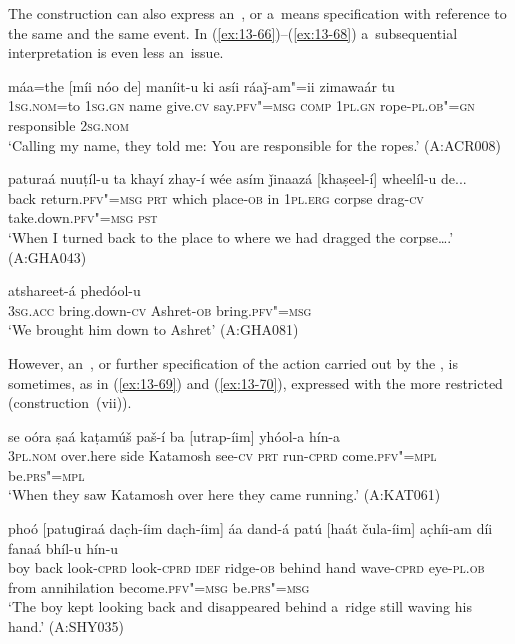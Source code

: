  The  construction can also express an~, or a~means specification with reference to the same  and the same event. In (\ref{ex:13-66})--(\ref{ex:13-68}) a~subsequential interpretation is even less an~issue.

\begin{exe}
\ex
\label{ex:13-66}
\gll máa=the [míi nóo de] maníit-u ki asíi ráaǰ-am"=ii zimawaár tu  \\
\textsc{1sg.nom}=to \textsc{1sg.gn} name give.\textsc{cv} say.\textsc{pfv"=msg} \textsc{comp}  \textsc{1pl.gn} rope-\textsc{pl.ob"=gn} responsible \textsc{2sg.nom}  \\
\glt `Calling my name, they told me: You are responsible for the ropes.' (A:ACR008)

\ex
\label{ex:13-67}
\gll paturaá nuuṭíl-u ta khayí zhay-í wée asím ǰinaazá [khaṣeel-í] wheelíl-u de... \\
back return.\textsc{pfv"=msg} \textsc{prt} which place-\textsc{ob} in \textsc{1pl.erg}  corpse drag-\textsc{cv} take.down.\textsc{pfv"=msg} \textsc{pst} \\
\glt `When I turned back to the place to where we had dragged the corpse{\ldots}.' (A:GHA043)

\ex
\label{ex:13-68}
 atshareet-á phedóol-u \\
\textsc{3sg.acc} bring.down-\textsc{cv} Ashret-\textsc{ob} bring.\textsc{pfv"=msg} \\
\glt `We brought him down to Ashret' (A:GHA081) 
\end{exe}

However, an~, or further specification of the action carried out by the , is sometimes, as in (\ref{ex:13-69}) and (\ref{ex:13-70}), expressed with the more restricted  (construction~(vii)).

\begin{exe}
\ex
\label{ex:13-69}
\gll se oóra ṣaá kaṭamúš paš-í ba [utrap-íim] yhóol-a hín-a \\
\textsc{3pl.nom} over.here side Katamosh see-\textsc{cv} \textsc{prt} run-\textsc{cprd} come.\textsc{pfv"=mpl} be.\textsc{prs"=mpl} \\
\glt `When they saw Katamosh over here they came running.' (A:KAT061)

\ex
\label{ex:13-70}
\gll phoó [patuɡiraá dac̣h-íim dac̣h-íim] áa dand-á patú [haát čula-íim] ac̣híi-am díi fanaá bhíl-u hín-u \\
boy back look-\textsc{cprd} look-\textsc{cprd} \textsc{idef}  ridge-\textsc{ob} behind hand wave-\textsc{cprd} eye-\textsc{pl.ob} from  annihilation become.\textsc{pfv"=msg} be.\textsc{prs"=msg} \\
\glt `The boy kept looking back and disappeared behind a~ridge still waving his hand.' (A:SHY035) 
\end{exe}

